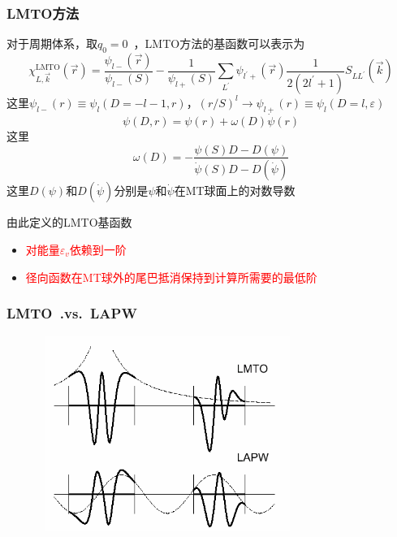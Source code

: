 \frame
{
	\frametitle{\textrm{LMTO}方法}
	对于周期体系，取$q_0=0$~，\textrm{LMTO}方法的基函数可以表示为
	\begin{displaymath}
		\chi_{L,\vec k}^{\mathrm{LMTO}}(\vec r)=\dfrac{\psi_{l-}(\vec r)}{\psi_{l-}(S)}-\dfrac1{\psi_{l+}(S)}\sum_{L^{\prime}}\psi_{l^{\prime}+}(\vec r)\dfrac1{2(2l^{\prime}+1)}S_{LL^{\prime}}(\vec k)
	\end{displaymath}
	这里$\psi_{l-}(r)\equiv\psi_l(D=-l-1,r)$，$(r/S)^l\rightarrow\psi_{l+}(r)\equiv\psi_l(D=l,\varepsilon)$
	$$\psi(D,r)=\psi(r)+\omega(D)\dot\psi(r)$$
	这里
	$$\omega(D)=-\dfrac{\psi(S)D-D(\psi)}{\dot\psi(S)D-D(\dot\psi)}$$
	这里$D(\psi)$和$D(\dot\psi)$分别是$\psi$和$\dot\psi$在\textrm{MT}球面上的对数导数

	由此定义的\textrm{LMTO}基函数
	\begin{itemize}
		\item \textcolor{red}{对能量$\varepsilon_v$依赖到一阶}
		\item \textcolor{red}{径向函数在\textrm{MT}球外的尾巴抵消保持到计算所需要的最低阶}
	\end{itemize}
}

\frame
{
	\frametitle{\textrm{LMTO~.vs.~LAPW}}
\begin{figure}[h!]
\centering
\vspace*{-0.15in}
\includegraphics[height=2.50in,width=3.30in,viewport=0 0 440 350,clip]{Figures/LMTO-vs-LAPW.png}
\caption{\fontsize{5.5pt}{4.2pt}}%
\label{LMTO-vs-LAPW}
\end{figure}
}

